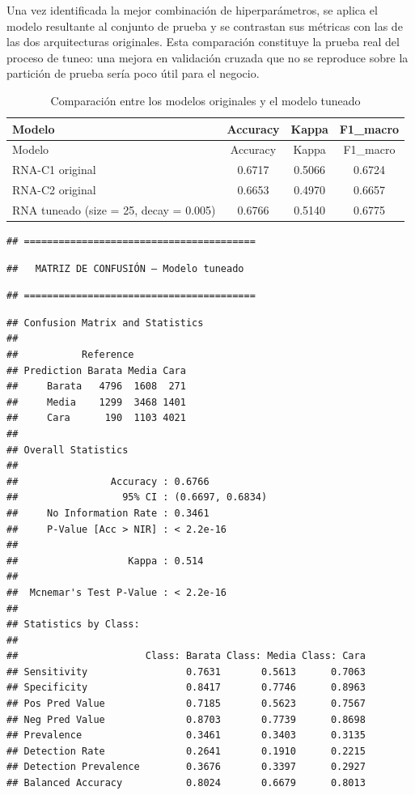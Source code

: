 \documentclass[
]{article}
\begin{document}
Una vez identificada la mejor combinación de hiperparámetros, se aplica
el modelo resultante al conjunto de prueba y se contrastan sus métricas
con las de las dos arquitecturas originales. Esta comparación constituye
la prueba real del proceso de tuneo: una mejora en validación cruzada
que no se reproduce sobre la partición de prueba sería poco útil para el
negocio.

\begin{longtable}[]{@{}lccc@{}}
\caption{Comparación entre los modelos originales y el modelo
tuneado}\tabularnewline
\toprule\noalign{}
Modelo & Accuracy & Kappa & F1\_macro \\
\midrule\noalign{}
\endfirsthead
\toprule\noalign{}
Modelo & Accuracy & Kappa & F1\_macro \\
\midrule\noalign{}
\endhead
\bottomrule\noalign{}
\endlastfoot
RNA-C1 original & 0.6717 & 0.5066 & 0.6724 \\
RNA-C2 original & 0.6653 & 0.4970 & 0.6657 \\
RNA tuneado (size = 25, decay = 0.005) & 0.6766 & 0.5140 & 0.6775 \\
\end{longtable}

\begin{verbatim}
## ========================================
\end{verbatim}

\begin{verbatim}
##   MATRIZ DE CONFUSIÓN – Modelo tuneado
\end{verbatim}

\begin{verbatim}
## ========================================
\end{verbatim}

\begin{verbatim}
## Confusion Matrix and Statistics
## 
##           Reference
## Prediction Barata Media Cara
##     Barata   4796  1608  271
##     Media    1299  3468 1401
##     Cara      190  1103 4021
## 
## Overall Statistics
##                                           
##                Accuracy : 0.6766          
##                  95% CI : (0.6697, 0.6834)
##     No Information Rate : 0.3461          
##     P-Value [Acc > NIR] : < 2.2e-16       
##                                           
##                   Kappa : 0.514           
##                                           
##  Mcnemar's Test P-Value : < 2.2e-16       
## 
## Statistics by Class:
## 
##                      Class: Barata Class: Media Class: Cara
## Sensitivity                 0.7631       0.5613      0.7063
## Specificity                 0.8417       0.7746      0.8963
## Pos Pred Value              0.7185       0.5623      0.7567
## Neg Pred Value              0.8703       0.7739      0.8698
## Prevalence                  0.3461       0.3403      0.3135
## Detection Rate              0.2641       0.1910      0.2215
## Detection Prevalence        0.3676       0.3397      0.2927
## Balanced Accuracy           0.8024       0.6679      0.8013
\end{verbatim}
\end{document}
